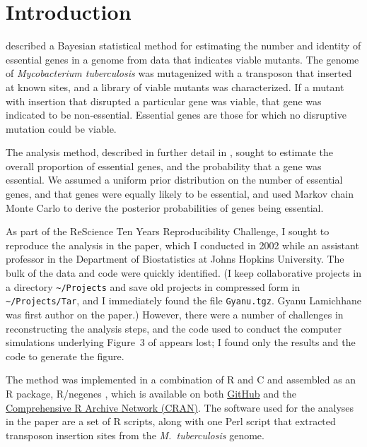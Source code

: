 \setlength{\parskip}{0.5\baselineskip}

\begin{quote}
\small
\articleABSTRACT
\end{quote}


\section{Introduction}

\citet{lamichhane2003} described a Bayesian statistical method for
estimating the number and identity of essential genes in a genome from
data that indicates viable mutants. The genome of \emph{Mycobacterium
tuberculosis\/} was mutagenized with a transposon that inserted at
known sites, and a library of viable mutants was characterized. If a
mutant with insertion that disrupted a particular gene was viable,
that gene was indicated to be non-essential. Essential genes are those
for which no disruptive mutation could be viable.

The analysis method, described in further detail in
\citet{blades2002}, sought to estimate the overall proportion of
essential genes, and the probability that a gene was essential. We
assumed a uniform prior distribution on the number of essential genes,
and that genes were equally likely to be essential, and used Markov
chain Monte Carlo to derive the posterior probabilities of genes being
essential.

As part of the ReScience Ten Years Reproducibility Challenge, I sought
to reproduce the analysis in the paper, which I conducted in 2002
while an assistant professor in the Department of Biostatistics at
Johns Hopkins University. The bulk of the data and code were quickly
identified. (I keep collaborative projects in a directory
{\tt {\textasciitilde}/Projects} and save old projects in compressed form in
{\tt {\textasciitilde}/Projects/Tar}, and I immediately found
the file {\tt Gyanu.tgz}. Gyanu Lamichhane was first author on the
paper.) However, there were a number of challenges in reconstructing
the analysis steps, and the code used to conduct the computer
simulations underlying Figure~3 of \citet{lamichhane2003} appears
lost; I found only the results and the code to generate the figure.

The method was implemented in a combination of R \citep{R} and C
\citep{C} and assembled as an R package, R/negenes \citep{negenes},
which is available on both
\href{https://github.com/kbroman/negenes}{GitHub} and the
\href{https://cran.r-project.org/package=negenes}{Comprehensive R
  Archive Network (CRAN)}. The software used for the analyses in the
paper are a set of R scripts, along with one Perl script
\citep{Perl} that extracted transposon insertion sites from the \emph{M.\
tuberculosis\/} genome.

